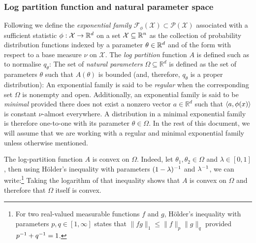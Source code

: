 

\subsubsection*{Log partition function and natural parameter space
}
Following  we define the \emph{exponential family} $\mathcal F_\phi(\mathcal X)\subset\mathcal P(\mathcal X)$ associated with a sufficient statistic $\phi:\mathcal X\to\mathbb R^{d}$ on a set $\mathcal X\subseteq \mathbb R^{n}$ as the collection of probability distribution functions indexed by a parameter $\theta\in\mathbb R^{d}$ and of the form
%
%
with respect to a base measure $\nu$ on $\mathcal X$. The \emph{log partition} function $A$ is defined such as to normalise $q_{\theta}$:
%
%
The set of \emph{natural parameters} $\Omega \subseteq \mathbb R^{d}$ is defined as the set of parameters $\theta$ such that $A(\theta)$ is bounded (and, therefore, $q_\theta$ is a proper distribution):
%
An exponential family is said to be \emph{regular} when the corresponding set $\Omega$ is nonempty and open. Additionally, an exponential family is said to be \emph{minimal} provided there does not exist a nonzero vector $a\in\mathbb R^{d}$ such that $\left\langle a,\phi(x) \right\rangle$ is constant $\nu$-almost everywhere. A distribution in a minimal exponential family is therefore one-to-one with its parameter $\theta\in\Omega$. In the rest of this document, we will assume that we are working with a regular and minimal exponential family unless otherwise mentioned.

The log-partition function $A$ is convex on $\Omega$. Indeed, let $\theta_1,\theta_2\in\Omega$ and $\lambda\in[0,1]$, then using H\"older's inequality with parameters $(1-\lambda)^{-1}$ and $\lambda^{-1}$, we can write:\footnote{For two real-valued measurable functions $f$ and $g$, H\"older's inequality with parameters $p,q\in[1,\infty]$ states that $\|fg\|_{1}\le \|f\|_{p}\|g\|_{q}$ provided $p^{-1}+q^{-1}=1$.}
Taking the logarithm of that inequality shows that $A$ is convex on $\Omega$ and therefore that $\Omega$ itself is convex.
%
